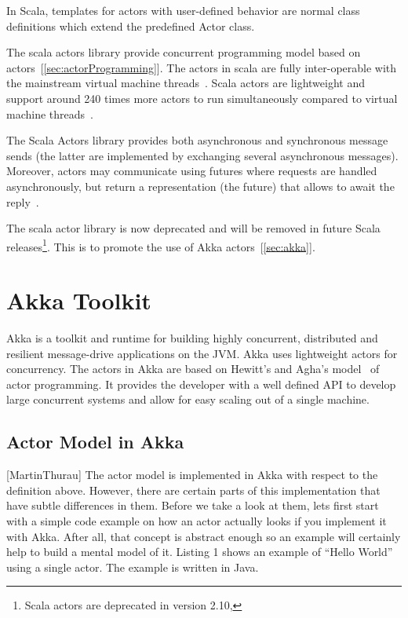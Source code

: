   In Scala, templates for actors with user-defined behavior are normal class definitions which extend the predefined Actor class.

  The scala actors library provide concurrent programming model based on actors~[\autoref{sec:actorProgramming}]. The actors in scala are fully inter-operable with the mainstream virtual machine threads~\cite{Haller}. Scala actors are lightweight and support around 240 times more actors to run simultaneously compared to virtual machine threads~\cite{Haller}.

  The Scala Actors library provides both asynchronous and synchronous message sends (the latter are implemented by exchanging several asynchronous messages). Moreover, actors may communicate using futures where requests are handled asynchronously, but return a representation (the future) that allows to await the reply~\cite{scalaActors}.

  The scala actor library is now deprecated and will be removed in future Scala releases\footnote{Scala actors are deprecated in version 2.10, }. This is to promote the use of Akka actors~[\autoref{sec:akka}].

\section{Akka Toolkit}
\label{sec:akka}
Akka is a toolkit and runtime for building highly concurrent, distributed and resilient message-drive applications on the JVM. Akka uses lightweight actors for concurrency. The actors in Akka are based on Hewitt's and Agha's model~\cite{agha, hewitt} of actor programming. It provides the developer with a well defined API to develop large concurrent systems and allow for easy scaling out of a single machine.
  \subsection{Actor Model in Akka}[MartinThurau]
The actor model is implemented in Akka with respect to the definition above. However, there are certain parts of this implementation that have subtle differences in them. Before we take a look at them, lets first start with a simple code example on how an actor actually looks if you implement it with Akka. After all, that concept is abstract enough so an example will certainly help to build a mental model of it. Listing 1 shows an example of “Hello World” using a single actor. The example is written in Java.

